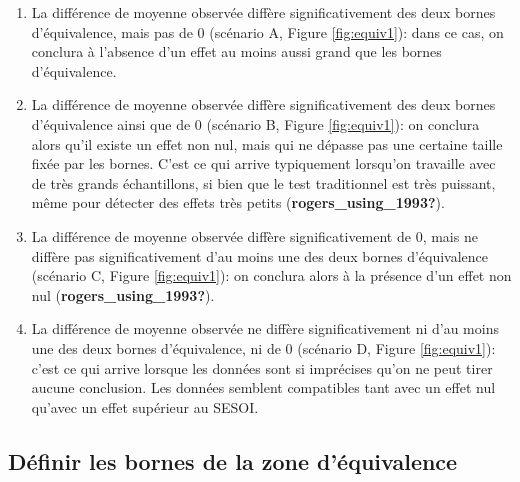\documentclass[
  english,
  man]{apa6}
\begin{document}
\begin{enumerate}
\def\labelenumi{(\arabic{enumi})}
\item
  La différence de moyenne observée diffère significativement des deux bornes d'équivalence, mais pas de 0 (scénario A, Figure \ref{fig:equiv1}): dans ce cas, on conclura à l'absence d'un effet au moins aussi grand que les bornes d'équivalence.
\item
  La différence de moyenne observée diffère significativement des deux bornes d'équivalence ainsi que de 0 (scénario B, Figure \ref{fig:equiv1}): on conclura alors qu'il existe un effet non nul, mais qui ne dépasse pas une certaine taille fixée par les bornes. C'est ce qui arrive typiquement lorsqu'on travaille avec de très grands échantillons, si bien que le test traditionnel est très puissant, même pour détecter des effets très petits (\textbf{rogers\_using\_1993?}).
\item
  La différence de moyenne observée diffère significativement de 0, mais ne diffère pas significativement d'au moins une des deux bornes d'équivalence (scénario C, Figure \ref{fig:equiv1}): on conclura alors à la présence d'un effet non nul (\textbf{rogers\_using\_1993?}).
\item
  La différence de moyenne observée ne diffère significativement ni d'au moins une des deux bornes d'équivalence, ni de 0 (scénario D, Figure \ref{fig:equiv1}): c'est ce qui arrive lorsque les données sont si imprécises qu'on ne peut tirer aucune conclusion. Les données semblent compatibles tant avec un effet nul qu'avec un effet supérieur au SESOI.
\end{enumerate}

\hypertarget{duxe9finir-les-bornes-de-la-zone-duxe9quivalence}{%
\subsection{Définir les bornes de la zone d'équivalence}\label{duxe9finir-les-bornes-de-la-zone-duxe9quivalence}}
\end{document}
